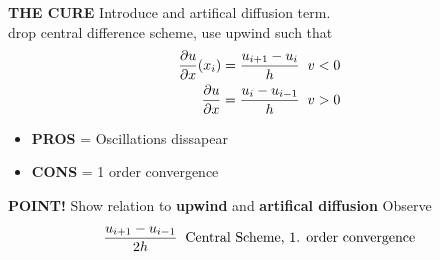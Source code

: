 \documentclass[a4paper,norsk]{article}
\begin{document}
\textbf{THE CURE} Introduce and artifical diffusion term. \\ drop central difference scheme, use upwind such that 
\begin{align*}
\pd[u]{x} (x_i) = \frac{u_{i+1}-u_{i}}{h} \hspace{2mm} v < 0 \\
\pd[u]{x} = \frac{u_{i}-u_{i-1}}{h} \hspace{2mm} v > 0
\end{align*}
\begin{itemize}
\item \textbf{PROS} = Oscillations dissapear
\item \textbf{CONS} = 1 order convergence
\end{itemize}
\textbf{POINT!} Show relation to \textbf{upwind} and \textbf{artifical diffusion}
Observe 
\begin{align*}
\frac{u_{i+1}-u_{i-1}}{2h} \hspace{2mm} \text{Central Scheme, 1. order convergence} \\
\end{align*}
 
\end{document}
